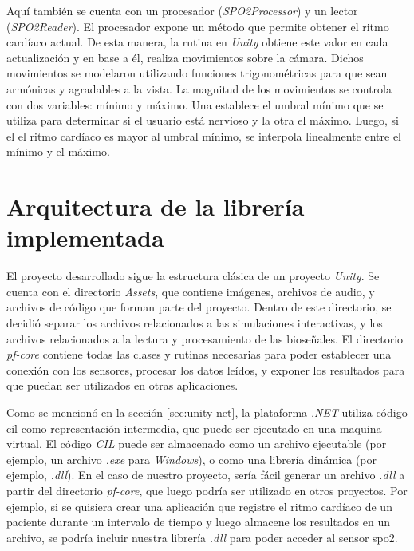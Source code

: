Aquí también se cuenta con un procesador (\emph{SPO2Processor}) y un lector (\emph{SPO2Reader}). El procesador expone un método que permite obtener el ritmo cardíaco actual. De esta manera, la rutina en \emph{Unity} obtiene este valor en cada actualización y en base a él, realiza movimientos sobre la cámara. Dichos movimientos se modelaron utilizando funciones trigonométricas para que sean armónicas y agradables a la vista. La magnitud de los movimientos se controla con dos variables: mínimo y máximo. Una establece el umbral mínimo que se utiliza para determinar si el usuario está nervioso y la otra el máximo. Luego, si el el ritmo cardíaco es mayor al umbral mínimo, se interpola linealmente entre el mínimo y el máximo.

\section{Arquitectura de la librería implementada}

El proyecto desarrollado sigue la estructura clásica de un proyecto \emph{Unity}. Se cuenta con el directorio \emph{Assets}, que contiene imágenes, archivos de audio, y archivos de código que forman parte del proyecto. Dentro de este directorio, se decidió separar los archivos relacionados a las simulaciones interactivas, y los archivos relacionados a la lectura y procesamiento de las bioseñales. El directorio \emph{pf-core} contiene todas las clases y rutinas necesarias para poder establecer una conexión con los sensores, procesar los datos leídos, y exponer los resultados para que puedan ser utilizados en otras aplicaciones.

Como se mencionó en la sección \ref{sec:unity-net}, la plataforma \emph{.NET} utiliza código \acrshort{cil} como representación intermedia, que puede ser ejecutado en una maquina virtual. El código \emph{CIL} puede ser almacenado como un archivo ejecutable (por ejemplo, un archivo \emph{.exe} para \emph{Windows}), o como una librería dinámica (por ejemplo, \emph{.dll}). En el caso de nuestro proyecto, sería fácil generar un archivo \emph{.dll} a partir del directorio \emph{pf-core}, que luego podría ser utilizado en otros proyectos. Por ejemplo, si se quisiera crear una aplicación que registre el ritmo cardíaco de un paciente durante un intervalo de tiempo y luego almacene los resultados en un archivo, se podría incluir nuestra librería \emph{.dll} para poder acceder al sensor \acrshort{spo2}.